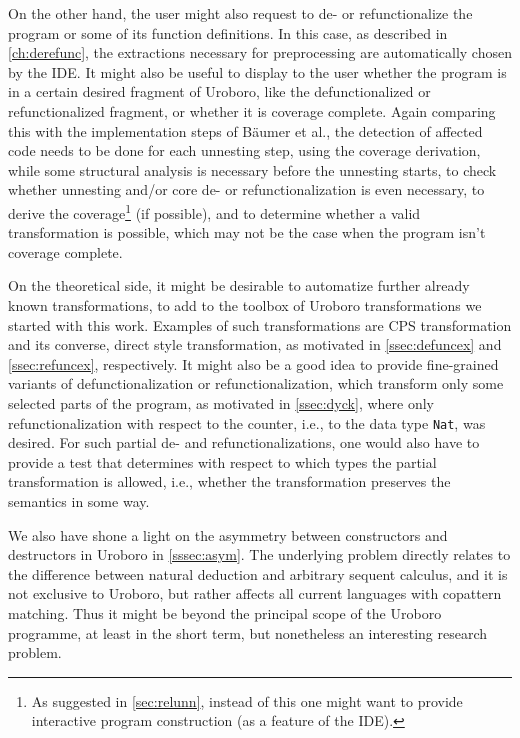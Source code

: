 On the other hand, the user might also request to de- or refunctionalize the program or some of its function definitions. In this case, as described in \autoref{ch:derefunc}, the extractions necessary for preprocessing are automatically chosen by the IDE. It might also be useful to display to the user whether the program is in a certain desired fragment of Uroboro, like the defunctionalized or refunctionalized fragment, or whether it is coverage complete. Again comparing this with the implementation steps of Bäumer et al., the detection of affected code needs to be done for each unnesting step, using the coverage derivation, while some structural analysis is necessary before the unnesting starts, to check whether unnesting and/or core de- or refunctionalization is even necessary, to derive the coverage\footnote{As suggested in \autoref{sec:relunn}, instead of this one might want to provide interactive program construction (as a feature of the IDE).} (if possible), and to determine whether a valid transformation is possible, which may not be the case when the program isn't coverage complete.

On the theoretical side, it might be desirable to automatize further already known transformations, to add to the toolbox of Uroboro transformations we started with this work. Examples of such transformations are CPS transformation and its converse, direct style transformation, as motivated in \autoref{ssec:defuncex} and \autoref{ssec:refuncex}, respectively. It might also be a good idea to provide fine-grained variants of defunctionalization or refunctionalization, which transform only some selected parts of the program, as motivated in \autoref{ssec:dyck}, where only refunctionalization with respect to the counter, i.e., to the data type \texttt{Nat}, was desired. For such partial de- and refunctionalizations, one would also have to provide a test that determines with respect to which types the partial transformation is allowed, i.e., whether the transformation preserves the semantics in some way.

We also have shone a light on the asymmetry between constructors and destructors in Uroboro in \autoref{sssec:asym}. The underlying problem directly relates to the difference between natural deduction and arbitrary sequent calculus, and it is not exclusive to Uroboro, but rather affects all current languages with copattern matching. Thus it might be beyond the principal scope of the Uroboro programme, at least in the short term, but nonetheless an interesting research problem.
